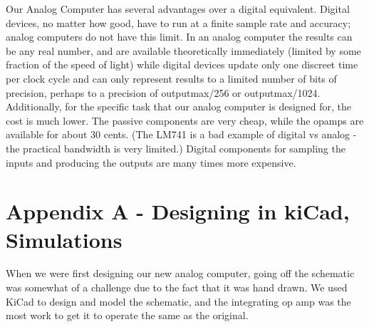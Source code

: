 \documentclass[11pt]{article}
\begin{document}
	Our Analog Computer has several advantages over a digital equivalent. Digital devices, no matter how good, have to run at a finite sample rate and accuracy; analog computers do not have this limit. In an analog computer the results can be any real number, and are available theoretically immediately (limited by some fraction of the speed of light) while digital devices update only one discreet time per clock cycle and can only represent results to a limited number of bits of precision, perhaps to a precision of outputmax/256 or outputmax/1024. Additionally, for the specific task that our analog computer is designed for, the cost is much lower. The passive components are very cheap, while the opamps are available for about 30 cents. (The LM741 is a bad example of digital vs analog - the practical bandwidth is very limited.) Digital components for sampling the inputs and producing the outputs are many times more expensive.
	\\
	\newpage
	\section*{Appendix A - Designing in kiCad, Simulations}
	When we were first designing our new analog computer, going off the schematic was somewhat of a challenge due to the fact that it was hand drawn. We used KiCad to design and model the schematic, and the integrating op amp was the most work to get it to operate the same as the original.
	
	
	
\end{document}
